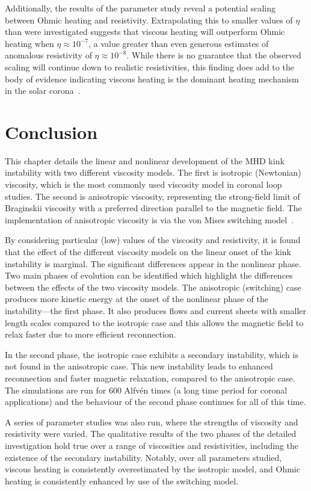 Additionally, the results of the parameter study reveal a potential scaling between Ohmic heating and resistivity. Extrapolating this to smaller values of $\eta$ than were investigated suggests that viscous heating will outperform Ohmic heating when $\eta\approx10^{-7}$, a value greater than even generous estimates of anomalous resistivity of $\eta \approx 10^{-8}$. While there is no guarantee that the observed scaling will continue down to realistic resistivities, this finding does add to the body of evidence indicating viscous heating is the dominant heating mechanism in the solar corona~\cite{craigAnisotropicViscousDissipation2009a,craigViscousDissipation3D2013}. 

\section{Conclusion}

\label{sec:conclusions}

This chapter details the linear and nonlinear development of the MHD kink
instability with two different viscosity models. The first is
isotropic (Newtonian) viscosity, which is the most commonly used
viscosity model in coronal loop studies. The second is anisotropic viscosity, representing the strong-field limit of Braginskii viscosity with a preferred direction parallel to the magnetic field. The implementation of anisotropic viscosity is via the von Mises switching model~\cite{mactaggartBraginskiiMagnetohydrodynamicsArbitrary2017}.

By considering particular (low) values of the viscosity and resistivity, it is found that the effect of the different viscosity models on the linear onset of the kink instability is marginal. The significant differences appear in the nonlinear phase. Two main phases of evolution can be identified which highlight the differences between the effects of the two viscosity models. The anisotropic (switching) case produces more kinetic energy at the onset of the nonlinear phase of the instability---the first phase. It also produces flows and current sheets with smaller length scales compared to the isotropic case and this allows the magnetic field to relax faster due to more efficient reconnection. 

In the second phase, the isotropic case exhibits a secondary instability, which is not found in the anisotropic case. This new instability leads to enhanced reconnection and faster magnetic relaxation, compared to the anisotropic case.  The simulations are run for $600$ Alfv\'en times (a long time period for coronal applications) and the behaviour of the second phase continues for all of this time.

A series of parameter studies was also run, where the strengths of viscosity and resistivity were varied. The qualitative results of the two phases of the detailed investigation hold true over a range of viscosities and resistivities, including the existence of the secondary instability. Notably, over all parameters studied, viscous heating is consistently overestimated by the isotropic model, and Ohmic heating is consistently enhanced by use of the switching model.
